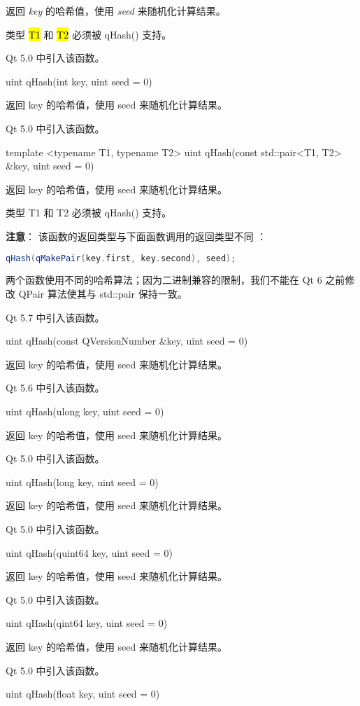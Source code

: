 返回 \emph{key} 的哈希值，使用 \emph{seed }来随机化计算结果。

类型 \hl{T1} 和 \hl{T2} 必须被 qHash() 支持。

Qt 5.0 中引入该函数。

uint qHash(int key, uint seed = 0)

返回 key 的哈希值，使用 seed 来随机化计算结果。

Qt 5.0 中引入该函数。

template <typename T1, typename T2> uint qHash(const std::pair<T1, T2> \&key, uint seed = 0)

返回 key 的哈希值，使用 seed 来随机化计算结果。

类型 T1 和 T2 必须被 qHash() 支持。

\textbf{注意}： 该函数的返回类型与下面函数调用的返回类型不同 ：


\begin{lstlisting}[language=C++]
qHash(qMakePair(key.first, key.second), seed);
\end{lstlisting}

两个函数使用不同的哈希算法；因为二进制兼容的限制，我们不能在 Qt 6 之前修改 QPair 算法使其与 std::pair 保持一致。

Qt 5.7 中引入该函数。

uint qHash(const QVersionNumber \&key, uint seed = 0)

返回 key 的哈希值，使用 seed 来随机化计算结果。

Qt 5.6 中引入该函数。

uint qHash(ulong key, uint seed = 0)

返回 key 的哈希值，使用 seed 来随机化计算结果。

Qt 5.0 中引入该函数。

uint qHash(long key, uint seed = 0)

返回 key 的哈希值，使用 seed 来随机化计算结果。

Qt 5.0 中引入该函数。

uint qHash(quint64 key, uint seed = 0)

返回 key 的哈希值，使用 seed 来随机化计算结果。

Qt 5.0 中引入该函数。

uint qHash(qint64 key, uint seed = 0)

返回 key 的哈希值，使用 seed 来随机化计算结果。

Qt 5.0 中引入该函数。

uint qHash(float key, uint seed = 0)

